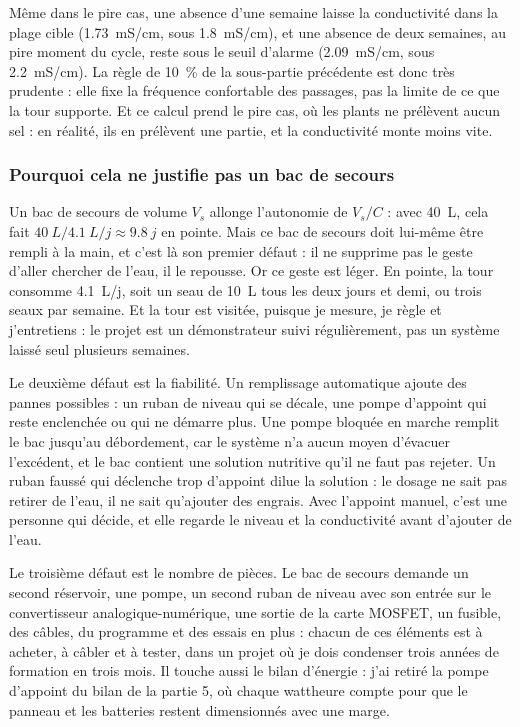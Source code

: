 Même dans le pire cas, une absence d'une semaine laisse la conductivité dans la plage cible (\qty{1,73}{mS/cm}, sous \qty{1,8}{mS/cm}), et une absence de deux semaines, au pire moment du cycle, reste sous le seuil d'alarme (\qty{2,09}{mS/cm}, sous \qty{2,2}{mS/cm}). La règle de \qty{10}{\percent} de la sous-partie précédente est donc très prudente : elle fixe la fréquence confortable des passages, pas la limite de ce que la tour supporte. Et ce calcul prend le pire cas, où les plants ne prélèvent aucun sel : en réalité, ils en prélèvent une partie, et la conductivité monte moins vite.

\subsubsection*{Pourquoi cela ne justifie pas un bac de secours}

Un bac de secours de volume $V_s$ allonge l'autonomie de $V_s/C$ : avec \qty{40}{L}, cela fait $\qty{40}{L}/\qty{4,1}{L/j} \approx \qty{9,8}{j}$ en pointe. Mais ce bac de secours doit lui-même être rempli à la main, et c'est là son premier défaut : il ne supprime pas le geste d'aller chercher de l'eau, il le repousse. Or ce geste est léger. En pointe, la tour consomme \qty{4,1}{L/j}, soit un seau de \qty{10}{L} tous les deux jours et demi, ou trois seaux par semaine. Et la tour est visitée, puisque je mesure, je règle et j'entretiens : le projet est un démonstrateur suivi régulièrement, pas un système laissé seul plusieurs semaines.

Le deuxième défaut est la fiabilité. Un remplissage automatique ajoute des pannes possibles : un ruban de niveau qui se décale, une pompe d'appoint qui reste enclenchée ou qui ne démarre plus. Une pompe bloquée en marche remplit le bac jusqu'au débordement, car le système n'a aucun moyen d'évacuer l'excédent, et le bac contient une solution nutritive qu'il ne faut pas rejeter. Un ruban faussé qui déclenche trop d'appoint dilue la solution : le dosage ne sait pas retirer de l'eau, il ne sait qu'ajouter des engrais. Avec l'appoint manuel, c'est une personne qui décide, et elle regarde le niveau et la conductivité avant d'ajouter de l'eau.

Le troisième défaut est le nombre de pièces. Le bac de secours demande un second réservoir, une pompe, un second ruban de niveau avec son entrée sur le convertisseur analogique-numérique, une sortie de la carte MOSFET, un fusible, des câbles, du programme et des essais en plus : chacun de ces éléments est à acheter, à câbler et à tester, dans un projet où je dois condenser trois années de formation en trois mois. Il touche aussi le bilan d'énergie : j'ai retiré la pompe d'appoint du bilan de la partie 5, où chaque wattheure compte pour que le panneau et les batteries restent dimensionnés avec une marge.

